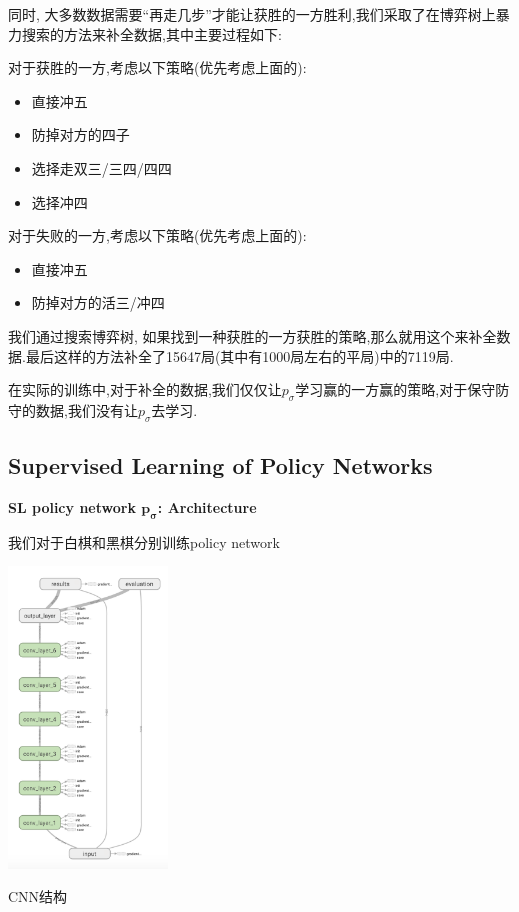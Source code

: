 \documentclass[twocolumn]{article}
\begin{document}
同时, 大多数数据需要“再走几步”才能让获胜的一方胜利,我们采取了在博弈树上暴力搜索的方法来补全数据,其中主要过程如下:

对于获胜的一方,考虑以下策略(优先考虑上面的):

\begin{itemize}
	\item 直接冲五
	\item 防掉对方的四子
	\item 选择走双三/三四/四四
	\item 选择冲四
\end{itemize}

对于失败的一方,考虑以下策略(优先考虑上面的):

\begin{itemize}
	\item 直接冲五
	\item 防掉对方的活三/冲四
\end{itemize}

我们通过搜索博弈树, 如果找到一种获胜的一方获胜的策略,那么就用这个来补全数据.最后这样的方法补全了15647局(其中有1000局左右的平局)中的7119局.

在实际的训练中,对于补全的数据,我们仅仅让$p_\sigma$学习赢的一方赢的策略,对于保守防守的数据,我们没有让$p_\sigma$去学习.

\subsection{Supervised Learning of Policy Networks}

\noindent \textbf{SL policy network $\bm{p_\sigma}$: Architecture}

我们对于白棋和黑棋分别训练policy network

\begin{center}
\makeatletter
\def\@captype{figure}
\makeatother
\includegraphics [height=8cm]{network}
\caption{CNN结构}
\label{network}
\end{center}
\end{document}

